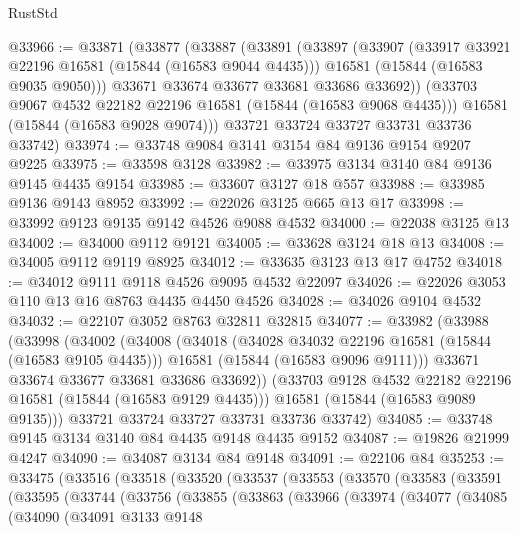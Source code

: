 \begin{lexlean}{RustStd}
\begin{coremodule}
@33966 := @33871
    (@33877
      (@33887
        (@33891
          (@33897
            (@33907
              (@33917 @33921 @22196 @16581 (@15844 (@16583 @9044 @4435)))
              @16581
              (@15844 (@16583 @9035 @9050)))
            @33671
            @33674
            @33677
            @33681
            @33686
            @33692))
        (@33703 @9067 @4532 @22182 @22196 @16581 (@15844 (@16583 @9068 @4435)))
        @16581
        (@15844 (@16583 @9028 @9074)))
      @33721
      @33724
      @33727
      @33731
      @33736
      @33742)
@33974 := @33748 @9084 @3141 @3154 @84 @9136 @9154 @9207 @9225
@33975 := @33598 @3128
@33982 := @33975 @3134 @3140 @84 @9136 @9145 @4435 @9154
@33985 := @33607 @3127 @18 @557
@33988 := @33985 @9136 @9143 @8952
@33992 := @22026 @3125 @665 @13 @17
@33998 := @33992 @9123 @9135 @9142 @4526 @9088 @4532
@34000 := @22038 @3125 @13
@34002 := @34000 @9112 @9121
@34005 := @33628 @3124 @18 @13
@34008 := @34005 @9112 @9119 @8925
@34012 := @33635 @3123 @13 @17 @4752
@34018 := @34012 @9111 @9118 @4526 @9095 @4532 @22097
@34026 := @22026 @3053 @110 @13 @16 @8763 @4435 @4450 @4526
@34028 := @34026 @9104 @4532
@34032 := @22107 @3052 @8763 @32811 @32815
@34077 := @33982
    (@33988
      (@33998
        (@34002
          (@34008
            (@34018
              (@34028 @34032 @22196 @16581 (@15844 (@16583 @9105 @4435)))
              @16581
              (@15844 (@16583 @9096 @9111)))
            @33671
            @33674
            @33677
            @33681
            @33686
            @33692))
        (@33703 @9128 @4532 @22182 @22196 @16581 (@15844 (@16583 @9129 @4435)))
        @16581
        (@15844 (@16583 @9089 @9135)))
      @33721
      @33724
      @33727
      @33731
      @33736
      @33742)
@34085 := @33748 @9145 @3134 @3140 @84 @4435 @9148 @4435 @9152
@34087 := @19826 @21999 @4247
@34090 := @34087 @3134 @84 @9148
@34091 := @22106 @84
@35253 := @33475
    (@33516
      (@33518
        (@33520
          (@33537
            (@33553
              (@33570
                (@33583
                  (@33591
                    (@33595
                      (@33744
                        (@33756
                          (@33855
                            (@33863
                              (@33966
                                (@33974
                                  (@34077
                                    (@34085
                                      (@34090
                                        (@34091
                                          @3133
                                          @9148

\end{coremodule}
\end{lexlean}

